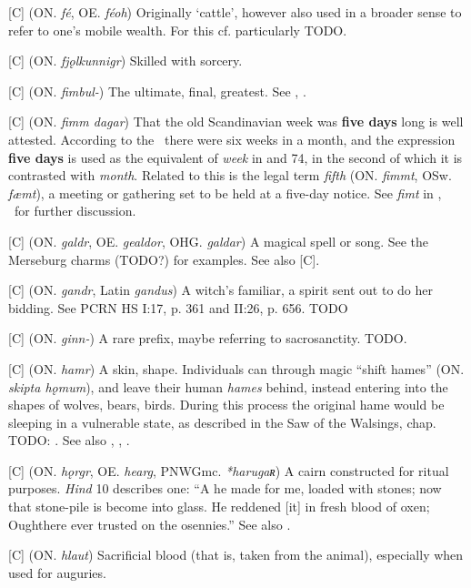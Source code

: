 \begin{itemize}
[C] (ON. \emph{fé}, OE. \emph{féoh})
  Originally ‘cattle’, however also used in a broader sense to refer to one’s mobile wealth. For this cf. particularly \Havamal TODO.

[C] (ON. \emph{fjǫlkunnigr})
  Skilled with sorcery.

[C] (ON. \emph{fimbul-})
  The ultimate, final, greatest. See , .

[C] (ON. \emph{fimm dagar})
  That the old Scandinavian week was \textbf{five days} long is well attested. According to the \Gulatingslog\ there were six weeks in a month, and the expression \textbf{five days} is used as the equivalent of \emph{week} in  and 74, in the second of which it is contrasted with \emph{month}. Related to this is the legal term \emph{fifth} (ON. \emph{fimmt}, OSw. \emph{fæmt}), a meeting or gathering set to be held at a five-day notice. See \emph{fimt} in \CV, \LMNL\ for further discussion.

[C] (ON. \emph{galdr}, OE. \emph{gealdor}, OHG. \emph{galdar})
  A magical spell or song. See the Merseburg charms (TODO?) for examples. See also [C].

[C] (ON. \emph{gandr}, Latin \emph{gandus})
  A witch’s familiar, a spirit sent out to do her bidding. See PCRN HS I:17, p. 361 and II:26, p. 656. TODO

[C] (ON. \emph{ginn-})
  A rare prefix, maybe referring to sacrosanctity. TODO.

[C] (ON. \emph{hamr})
  A skin, shape. Individuals can through magic “shift hames” (ON. \emph{skipta hǫmum}), and leave their human \emph{hames} behind, instead entering into the shapes of wolves, bears, birds. During this process the original hame would be sleeping in a vulnerable state, as described in the Saw of the Walsings, chap. TODO: . See also , , .

[C] (ON. \emph{hǫrgr}, OE. \emph{hearg}, PNWGmc. \emph{*harugaʀ})
  A cairn constructed for ritual purposes. \emph{Hind} 10 describes one: “A  he made for me, loaded with stones; now that stone-pile is become into glass. He reddened [it] in fresh blood of oxen; Oughthere ever trusted on the osennies.” See also .

[C] (ON. \emph{hlaut})
  Sacrificial blood (that is, taken from the animal), especially when used for auguries.


\end{itemize}
